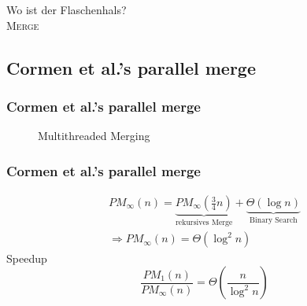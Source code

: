 \begin{frame}
    \centering
    \huge
    Wo ist der Flaschenhals? \\

    \pause
    {\rmfamily\textsc{Merge}}
\end{frame}

\subsection{Cormen et al.'s parallel merge}
\begin{frame}
    \frametitle{Cormen et al.'s parallel merge}
    \begin{figure}
        \centering
        
        \caption{Multithreaded Merging \cite[S.798]{cormen}}
        \label{fig:p-merge}
    \end{figure}
\end{frame}

\begin{frame}
    \frametitle{Cormen et al.'s parallel merge}
    \begin{equation}
        \begin{gathered}
            PM_\infty(n) =
            \underbrace{PM_\infty\left( \frac{3}{4}n \right)}_{\text{rekursives Merge}}
            + \underbrace{\Theta(\log n)}_{\text{Binary Search}}
            \\
            \Rightarrow PM_\infty(n) = \Theta(\log^2 n)
        \end{gathered}
    \end{equation}
    \pause
    Speedup
    \begin{equation}
        \frac{PM_1(n)}{PM_\infty(n)} = \Theta \left( \frac{n}{\log^2 n} \right)
    \end{equation}
\end{frame}

